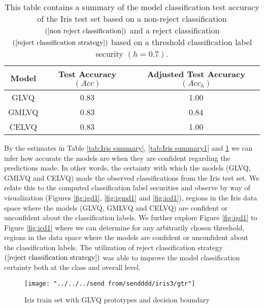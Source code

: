 \begin{table}[H]
	\centering
	\begin{tabular}{ |c|c|c|  }
		\hline
		Model & Test Accuracy $(Acc)$ & Adjusted Test Accuracy $(Acc_{h})$   \\
		\hline
		GLVQ &0.83   &1.00   \\
		GMLVQ &0.83  &0.84   \\
		CELVQ &0.83  &1.00   \\		
		\hline
	\end{tabular}
	\caption[Summary of model classification test accuracy of the Iris test set]{\label{tab:Iris summary2}This table contains a summary of the model classification test accuracy of the Iris test set based on a non-reject classification\hspace{2pt}$(\ref{non reject classification})$\hspace{2pt} and a reject classification\hspace{2pt} $(\ref{reject classification strategy})$\hspace{2pt} based on a threshold classification label security\hspace{2pt} $(h=0.7)$.\hspace{2pt}}
\end{table}
By the estimates in Table \ref{tab:Iris summary}, \ref{tab:Iris summary1} and \ref{tab:Iris summary2} we can infer how accurate the models are when they are confident regarding the predictions made. In other words, the certainty with which the models (GLVQ, GMLVQ and CELVQ) made the observed classifications from the Iris test set. We relate this to the computed classification label securities and observe by way of visualization (Figures \ref{fig:igd1}, \ref{fig:igmd1} and \ref{fig:icd1}), regions in the Iris data space where the models (GLVQ, GMLVQ and CELVQ) are confident or unconfident about the classification labels. We further explore Figure \ref{fig:igd1} to Figure \ref{fig:icd1} where we can determine for any arbitrarily chosen threshold, regions in the data space where the models are confident or unconfident about the classification labels. The utilization of reject classification strategy $\left( \ref{reject classification strategy}\right) $ was able to improve the model classification certainty both at the class and overall level.

\begin{figure}[H]
	\centering
	\texttt{[image: "../../../send from/sendddd/iris3/gtr"]}
	\caption[Iris train set with GLVQ prototypes]{Iris train set with GLVQ prototypes and decision boundary}
	\label{fig:ig1}
\end{figure}

